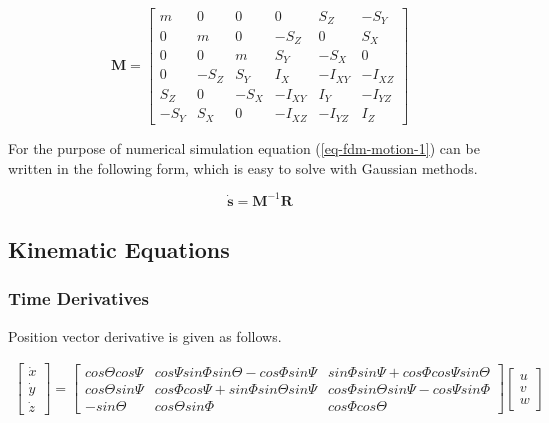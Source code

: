 \begin{equation}
 \boldsymbol M
 =
  \left[
    \begin{matrix}
         m &    0 &    0 &    0    &     S_Z &    -S_Y \\
         0 &    m &    0 & -S_Z    &       0 &     S_X \\
         0 &    0 &    m &  S_Y    &    -S_X &       0 \\
         0 & -S_Z &  S_Y &  I_X    & -I_{XY} & -I_{XZ} \\
       S_Z &    0 & -S_X & -I_{XY} &  I_Y    & -I_{YZ} \\
      -S_Y &  S_X &    0 & -I_{XZ} & -I_{YZ} &  I_Z
    \end{matrix}
  \right]
\end{equation}

For the purpose of numerical simulation equation (\ref{eq-fdm-motion-1}) can be written in the following form, which is easy to solve with Gaussian methods.

\begin{equation}
  \label{eq-fdm-motion-2}
  \dot {\boldsymbol s} = {\boldsymbol M}^{-1} \boldsymbol R
\end{equation}

\subsection{Kinematic Equations}

\subsubsection{Time Derivatives}

Position vector derivative is given as follows. \cite{Allerton2009}

\begin{gather}
  \label{eq-fdm-position-deriv}
  \left[
    \begin{matrix}
      \dot x \\
      \dot y \\
      \dot z
    \end{matrix}
  \right]
  =
    \left[
    \begin{matrix}
      cos\Theta cos\Psi &
      cos\Psi sin\Phi sin\Theta - cos\Phi sin\Psi &
      sin\Phi sin\Psi + cos\Phi cos\Psi sin\Theta \\
      cos\Theta sin\Psi &
      cos\Phi cos\Psi + sin\Phi sin\Theta sin\Psi &
      cos\Phi sin\Theta sin\Psi - cos\Psi sin\Phi \\
      -sin\Theta &
      cos\Theta sin\Phi &
      cos\Phi cos\Theta
    \end{matrix}
  \right]
  \left[
    \begin{matrix}
      u \\
      v \\
      w
    \end{matrix}
  \right]
\end{gather}


